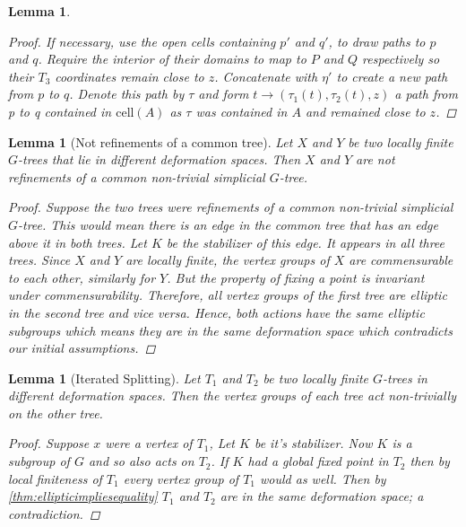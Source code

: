 \documentclass[12pt,parskip=full]{report}
\theoremstyle{plain}
\newtheorem{lem}[thm]{Lemma}
\theoremstyle{definition}
\begin{document}
\begin{lem}
\begin{proof}
If necessary, use the open cells containing \(p'\) and \(q'\), to draw paths  to \(p\) and \(q\). Require the interior of their domains to map to \(P\) and \(Q\) respectively so their \(T_3\) coordinates remain close to \(z\). Concatenate with \(\eta'\) to create a new path from \(p\) to \(q\). Denote this path by \(\tau\) and form \(t\to (\tau_1(t), \tau_2(t), z)\) a path from p to q contained in \(\text{cell}(A)\) as \(\tau\) was contained in \(A\) and remained close to \(z\).
    
    \end{proof}
    
    
\end{lem}

\begin{lem}
    [Not refinements of a common tree]
    \label{lem:nocommonrefinement} 
    Let \(X\) and \(Y\) be two locally finite \(G\)-trees that lie in different deformation spaces. Then $X$ and $Y$ are not refinements of a common non-trivial simplicial $G$-tree.
    \begin{proof}
        Suppose the two trees were refinements of a common non-trivial simplicial $G$-tree. This would mean there is an edge in the common tree that has an edge above it in both trees. Let \(K\) be the stabilizer of this edge. It appears in all three trees. Since $X$ and $Y$ are locally finite, the vertex groups of $X$ are commensurable to each other, similarly for $Y$. But the property of fixing a point is invariant under commensurability. Therefore, all vertex groups of the first tree are elliptic in the second tree and vice versa. Hence, both actions have the same elliptic subgroups which means they are in the same deformation space which contradicts our initial assumptions.
    \end{proof}
\end{lem}

\begin{lem}
    [Iterated Splitting]
    \label{lem:iteratedsplitting} 
    Let \(T_1\) and \(T_2\) be two locally finite \(G\)-trees in different deformation spaces. Then the vertex groups of each tree act non-trivially on the other tree.
    \begin{proof}
        Suppose \(x\) were a vertex of \(T_1\), Let \(K\) be it's stabilizer. Now \(K\) is a subgroup of \(G\) and so also acts on \(T_2\). If \(K\) had a global fixed point in \(T_2\)  then by local finiteness of \(T_1\) every vertex group of \(T_1\) would as well. Then by \ref{thm:ellipticimpliesequality} \(T_1\) and \(T_2\) are in the same deformation space; a contradiction.
    \end{proof}
\end{lem}
\end{document}

